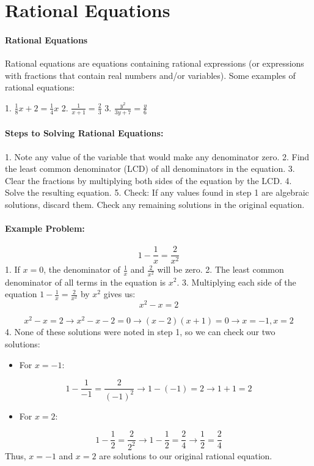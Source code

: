 \section{Rational Equations}
\label{sec:rational-equations}

\paragraph{Rational Equations}

Rational equations are equations containing rational expressions (or expressions with fractions that contain real numbers and/or variables). Some examples of rational equations:

1. $ \frac{1}{8}x + 2 = \frac{1}{4}x $
2. $ \frac{1}{x+1} = \frac{2}{3} $
3. $ \frac{y^{2}}{3y + 7} = \frac{y}{6} $

\paragraph{Steps to Solving Rational Equations:}

1. Note any value of the variable that would make any denominator zero.
2. Find the least common denominator (LCD) of all denominators in the equation.
3. Clear the fractions by multiplying both sides of the equation by the LCD.
4. Solve the resulting equation.
5. Check: If any values found in step 1 are algebraic solutions, discard them. Check any remaining solutions in the original equation.

\paragraph{Example Problem:}
$$
1 - \frac{1}{x} = \frac{2}{x^2}
$$
1. If $x = 0$, the denominator of $\frac{1}{x}$ and $\frac{2}{x^2}$ will be zero.
2. The least common denominator of all terms in the equation is $x^2$.
3. Multiplying each side of the equation $1 - \frac{1}{x} = \frac{2}{x^2}$ by $x^2$ gives us:
$$
x^2 - x = 2
$$

$$
x^2 - x = 2 \rightarrow x^2 - x - 2 = 0 \rightarrow (x - 2)(x + 1) = 0 \rightarrow x = -1, x = 2
$$
4. None of these solutions were noted in step 1, so we can check our two solutions:

\begin{itemize}
    \item For $x = -1$:
\end{itemize}
$$
1 - \frac{1}{-1} = \frac{2}{(-1)^2} \rightarrow 1 - (-1) = 2 \rightarrow 1 + 1 = 2
$$
\begin{itemize}
    \item For $x = 2$:
\end{itemize}
$$
1 - \frac{1}{2} = \frac{2}{2^2} \rightarrow 1 - \frac{1}{2} = \frac{2}{4} \rightarrow \frac{1}{2} = \frac{2}{4}
$$
Thus, $x = -1$ and $x = 2$ are solutions to our original rational equation.

